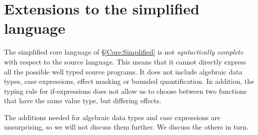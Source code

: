 \clearpage{}
\section{Extensions to the simplified language}
\label{Core:Bounded}

The simplified core language of \S\ref{Core:Simplified} is not \emph{syntactically complete} with respect to the source language. This means that it cannot directly express all the possible well typed source programs. It does not include algebraic data types, case expressions, effect masking or bounded quantification. In addition, the typing rule for if-expressions does not allow us to choose between two functions that have the same value type, but differing effects.

The additions needed for algebraic data types and case expressions are unsurprising, so we will not discuss them further. We discuss the others in turn.



